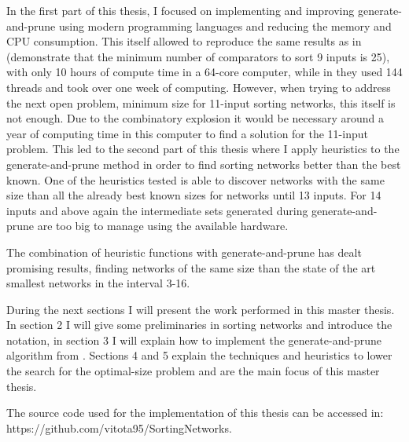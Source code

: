 \documentclass[../main.tex]{subfiles}
\begin{document}
In the first part of this thesis, I focused on implementing and improving generate-and-prune using modern programming languages and reducing the memory and CPU consumption. This itself allowed to reproduce the same results as in \cite{sortingnineinputs} (demonstrate that the minimum number of comparators to sort 9 inputs is 25), with only 10 hours of compute time in a 64-core computer, while in \cite{sortingnineinputs} they used 144 threads and took over one week of computing. However, when trying to address the next open problem, minimum size for 11-input sorting networks, this itself is not enough. Due to the combinatory explosion it would be necessary around a year of computing time in this computer to find a solution for the 11-input problem. This led to the second part of this thesis where I apply heuristics to the generate-and-prune method in order to find sorting networks better than the best known. One of the heuristics tested is able to discover networks with the same size than all the already best known sizes for networks until 13 inputs. For 14 inputs and above again the intermediate sets generated during generate-and-prune are too big to manage using the available hardware.

The combination of heuristic functions with generate-and-prune has dealt promising results, finding networks of the same size than the state of the art smallest networks in the interval 3-16. 

During the next sections I will present the work performed in this master thesis. In section 2 I will give some preliminaries in sorting networks and introduce the notation, in section 3 I will explain how to implement the generate-and-prune algorithm from \cite{sortingnineinputs}. Sections 4 and 5 explain the techniques and heuristics to lower the search for the optimal-size problem and are the main focus of this master thesis.

The source code used for the implementation of this thesis can be accessed in: https://github.com/vitota95/SortingNetworks.
\newpage
\end{document}
